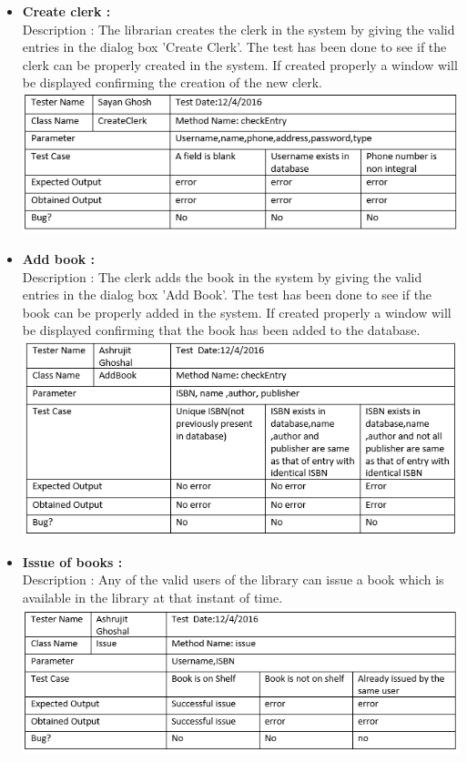 \documentclass{article}
\begin{document}
\begin{itemize}
	\item \textbf{Create clerk :} \\
	Description : The librarian creates the clerk in the system by giving the valid entries in the dialog box 'Create Clerk'. The test has been done to see if the clerk can be properly created in the system. If created properly a window will be displayed confirming the creation of the new clerk.\\
	\includegraphics[scale=0.8]{images/Tables/CreateClerk.PNG}
	
	\item \textbf{Add book :} \\
	Description : The clerk adds the book in the system by giving the valid entries in the dialog box 'Add Book'. The test has been done to see if the book can be properly added in the system. If created properly a window will be displayed confirming that the book has been added to the database.\\
	\includegraphics[scale=0.8]{images/Tables/AddBook.PNG}
	
	
	
	\item \textbf{Issue of books :} \\
	Description : Any of the valid users of the library can issue a book which is available in the library at that instant of time.\\
	\includegraphics[scale=0.8]{images/Tables/Issue.PNG}
	

\end{itemize}
\end{document}
